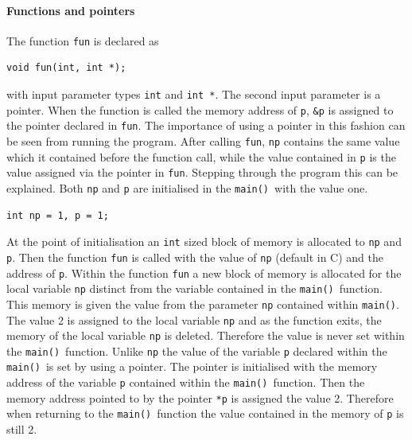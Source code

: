 \documentclass[11pt]{scrartcl}
\def\main{\texttt{main()}}
\begin{document}
\paragraph{Functions and pointers}
The function \texttt{fun} is declared as 
\begin{lstlisting}
void fun(int, int *);
\end{lstlisting}
with input parameter types \texttt{int} and \texttt{int *}.  The
second input parameter is a pointer.  When the function is called the
memory address of \texttt{p}, \texttt{\&p} is assigned to the pointer
declared in \texttt{fun}.  The importance of using a pointer in this
fashion can be seen from running the program.  After calling
\texttt{fun}, \texttt{np} contains the same value which it contained
before the function call, while the value contained in \texttt{p} is
the value assigned via the pointer in
\texttt{fun}.  Stepping through the program this can be explained.
Both \texttt{np} and \texttt{p} are initialised in the \main\ with the
value one.
\begin{lstlisting}
int np = 1, p = 1;
\end{lstlisting}
At the point of initialisation an \texttt{int} sized block of memory
is allocated to \texttt{np} and \texttt{p}.  Then the function
\texttt{fun} is called with the value of \texttt{np} (default in C) and the
address of \texttt{p}.  Within the function \texttt{fun} a new block
of memory is allocated for the local variable \texttt{np} distinct
from the variable contained in the \main\ function.  This memory is
given the value from the parameter \texttt{np} contained within
\main.  The value 2 is assigned to the local variable \texttt{np}
and as the function exits, the memory of the local variable \texttt{np}
is deleted.  Therefore the value is never set within the \main\
function.  Unlike \texttt{np} the value of the variable \texttt{p}
declared within
the \main\ is set by using a pointer.  The pointer is initialised with the
memory address of the variable \texttt{p} contained within the \main\
function.  Then the memory address pointed to by the pointer
\texttt{*p} is assigned the value 2.  Therefore when returning to the
\main\ function the value contained in the memory of \texttt{p} is
still 2.
\end{document}
